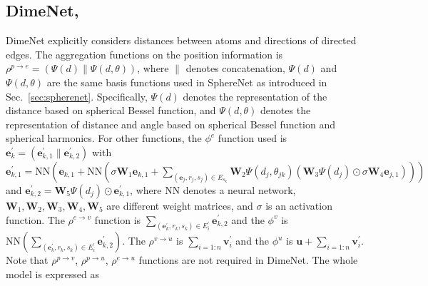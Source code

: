 \documentclass{article}
\begin{document}
\subsection[DimeNet,]{DimeNet, \cite{klicpera_dimenet_2020}}
DimeNet explicitly considers distances between atoms and directions of directed edges.
The aggregation functions on the position information is $\rho^{p\rightarrow e}=\left(\Psi\left(d\right)\|\Psi\left(d, \theta\right)\right)$, where $\|$ denotes concatenation,
$\Psi\left(d\right)$ and $\Psi\left(d, \theta\right)$ are the same basis functions used in SphereNet
as introduced in Sec.~\ref{sec:spherenet}. Specifically,
$\Psi\left(d\right)$ denotes the representation of the distance based on spherical Bessel function, and $\Psi\left(d, \theta\right)$ denotes the representation of distance and angle based on spherical Bessel function and spherical harmonics. For other functions, the $\phi^e$ function used is $\mathbf{e}^\prime_k=\left(\mathbf{e}^\prime_{k,1}\|\mathbf{e}^\prime_{k,2}\right)$ with $\mathbf{e}^\prime_{k,1}=\text{NN}\left(\mathbf{e}_{k,1}+\text{NN}\left(\sigma\mathbf{W}_1\mathbf{e}_{k,1}+\sum_{\left(\mathbf{e}_j, r_j, s_j\right)\in E_{s_k}}\mathbf{W}_2\Psi\left(d_j, \theta_{jk}\right)\left(\mathbf{W}_3 \Psi\left(d_j\right) \odot \sigma\mathbf{W}_4\mathbf{e}_{j,1}\right)\right)\right)$ and $\mathbf{e}^\prime_{k,2}=\mathbf{W}_5\Psi\left(d_j\right)\odot \mathbf{e}^\prime_{k,1}$, where $\text{NN}$ denotes a neural network, $\mathbf{W}_1, \mathbf{W}_2, \mathbf{W}_3,\mathbf{W}_4, \mathbf{W}_5$ are different weight matrices, and $\sigma$ is an activation function. The $\rho^{e\rightarrow v}$ function is $\sum_{\left(\mathbf{e}^\prime_k, r_k, s_k\right)\in E_{i}^\prime}\mathbf{e}^\prime_{k,2}$ and the $\phi^v$ is $\text{NN}\left(\sum_{\left(\mathbf{e}^\prime_k, r_k, s_k\right)\in E_{i}^\prime}\mathbf{e}^\prime_{k,2}\right)$. The $\rho^{v\rightarrow u}$ is $\sum_{i=1:n}\mathbf{v}^\prime_i$ and the $\phi^u$ is $\mathbf{u} + \sum_{i=1:n}\mathbf{v}^\prime_i$. 
Note that $\rho^{p\rightarrow v}$, $\rho^{p\rightarrow u}$, $\rho^{e\rightarrow u}$ functions are not required in DimeNet. The whole model is expressed as
\end{document}
